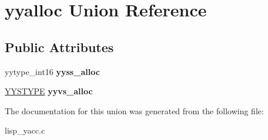 \hypertarget{unionyyalloc}{\section{yyalloc Union Reference}
\label{unionyyalloc}
}
\subsection*{Public Attributes}
\begin{DoxyCompactItemize}
\item 
\hypertarget{unionyyalloc_a4800e0520a89a4789afa7b5d82197e65}{yytype\-\_\-int16 {\bfseries yyss\-\_\-alloc}}\label{unionyyalloc_a4800e0520a89a4789afa7b5d82197e65}

\item 
\hypertarget{unionyyalloc_a9326f4fdc6f737a929444427836d8928}{\hyperlink{unionYYSTYPE}{Y\-Y\-S\-T\-Y\-P\-E} {\bfseries yyvs\-\_\-alloc}}\label{unionyyalloc_a9326f4fdc6f737a929444427836d8928}

\end{DoxyCompactItemize}


The documentation for this union was generated from the following file\-:\begin{DoxyCompactItemize}
\item 
lisp\-\_\-yacc.\-c\end{DoxyCompactItemize}
